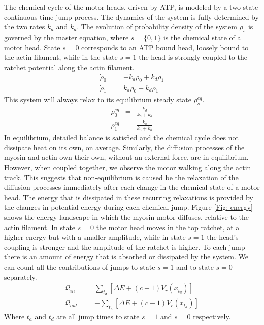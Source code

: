 \documentclass[aps,pre,onecolumn,showpacs,showkeys,a4paper]{revtex4}
\begin{document}
The chemical cycle of the motor heads, driven by ATP, is modeled by a two-state continuous time jump process. The dynamics of the system is fully determined by the two rates $k_a$ and $k_d$. The evolution of probability density of the system $\rho_s$ is governed by the master equation, where $s = \{0,1\}$ is the chemical state of a motor head. State $s=0$ corresponds to an ATP bound head, loosely bound to the actin filament, while in the state $s=1$ the head is strongly coupled to the ratchet potential along the actin filament.
\begin{eqnarray}
\dot{\rho}_0 &=& -k_a \rho_0 + k_d \rho_1\\
\dot{\rho}_1 &=& k_a \rho_0 - k_d \rho_1 
\end{eqnarray}
This system will always relax to its equilibrium steady state $\rho^{eq}_s$.
\begin{eqnarray}
\rho^{eq}_0 &=& \frac{k_d}{k_a+k_d}\\
\rho^{eq}_1 &=& \frac{k_a}{k_a+k_d} 
\end{eqnarray}
In equilibrium, detailed balance is satisfied and the chemical cycle does not dissipate heat on its own, on average.
Similarly, the diffusion processes of the myosin and actin own their own, without an external force, are in equilibrium.
However, when coupled together, we observe the motor walking along the actin track. This suggests that non-equilibrium is caused be the relaxation of the diffusion processes immediately after each change in the chemical state of a motor head. The energy that is dissipated in these recurring relaxations is provided by the changes in potential energy during each chemical jump. Figure \ref{Fig: energy} shows the energy landscape in which the myosin motor diffuses, relative to the actin filament. In state $s=0$ the motor head moves in the top ratchet, at a higher energy but with a smaller amplitude, while in state $s=1$ the head's coupling is stronger and the amplitude of the ratchet is higher. To each jump there is an amount of energy that is absorbed or dissipated by the system. We can count all the contributions of jumps to state $s=1$ and to state $s=0$ separately.
\begin{eqnarray}
\mathcal Q_{in} &=& \sum_{t_d} \left[\Delta E + (c-1)V_r(x_{t_d})\right]\label{q_in}\\
\mathcal Q_{out} &=& -\sum_{t_a} \left[\Delta E + (c-1)V_r(x_{t_a})\right]\label{q_out}
\end{eqnarray}
Where $t_a$ and $t_d$ are all jump times to state $s=1$ and $s=0$ respectively. 
\end{document}
